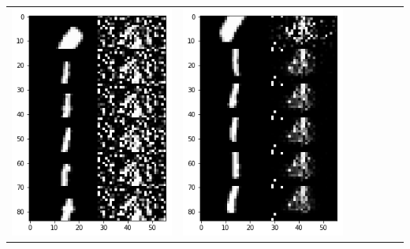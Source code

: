 \documentclass[12pt]{report} %
\begin{document}
\begin{tabular}{m{0.7cm}m{2.4cm}m{2.4cm}m{2.4cm}m{2.4cm}m{2.4cm}m{2.4cm}}
\includegraphics[scale=0.3]{pictures/M2_1_up.png} & \includegraphics[scale=0.3]{pictures/M2_1_down.png}\\

\end{tabular}
\end{document}
